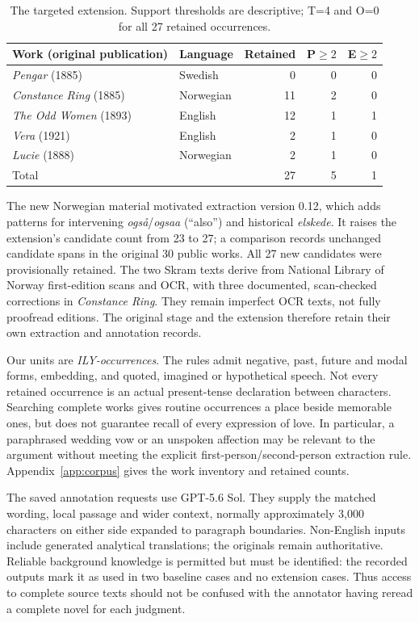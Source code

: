 \documentclass[11pt,a4paper]{article}
\begin{document}
\begin{table}[htbp]
\centering
\caption{The targeted extension. Support thresholds are descriptive; T=4 and O=0 for all 27 retained occurrences.}
\label{tab:extension}
\begin{tabular}{llrrr}
\toprule
Work (original publication) & Language & Retained & P$\geq2$ & E$\geq2$ \\
\midrule
\emph{Pengar} (1885) & Swedish & 0 & 0 & 0 \\
\emph{Constance Ring} (1885) & Norwegian & 11 & 2 & 0 \\
\emph{The Odd Women} (1893) & English & 12 & 1 & 1 \\
\emph{Vera} (1921) & English & 2 & 1 & 0 \\
\emph{Lucie} (1888) & Norwegian & 2 & 1 & 0 \\
\midrule
Total & & 27 & 5 & 1 \\
\bottomrule
\end{tabular}
\end{table}

The new Norwegian material motivated extraction version 0.12, which adds patterns for intervening \emph{også}/\emph{ogsaa} (“also”) and historical \emph{elskede}. It raises the extension's candidate count from 23 to 27; a comparison records unchanged candidate spans in the original 30 public works. All 27 new candidates were provisionally retained. The two Skram texts derive from National Library of Norway first-edition scans and OCR, with three documented, scan-checked corrections in \emph{Constance Ring}. They remain imperfect OCR texts, not fully proofread editions. The original stage and the extension therefore retain their own extraction and annotation records.

Our units are \emph{ILY-occurrences}. The rules admit negative, past, future and modal forms, embedding, and quoted, imagined or hypothetical speech. Not every retained occurrence is an actual present-tense declaration between characters. Searching complete works gives routine occurrences a place beside memorable ones, but does not guarantee recall of every expression of love. In particular, a paraphrased wedding vow or an unspoken affection may be relevant to the argument without meeting the explicit first-person/second-person extraction rule. Appendix~\ref{app:corpus} gives the work inventory and retained counts.

The saved annotation requests use GPT-5.6 Sol. They supply the matched wording, local passage and wider context, normally approximately 3,000 characters on either side expanded to paragraph boundaries. Non-English inputs include generated analytical translations; the originals remain authoritative. Reliable background knowledge is permitted but must be identified: the recorded outputs mark it as used in two baseline cases and no extension cases. Thus access to complete source texts should not be confused with the annotator having reread a complete novel for each judgment.
\end{document}
